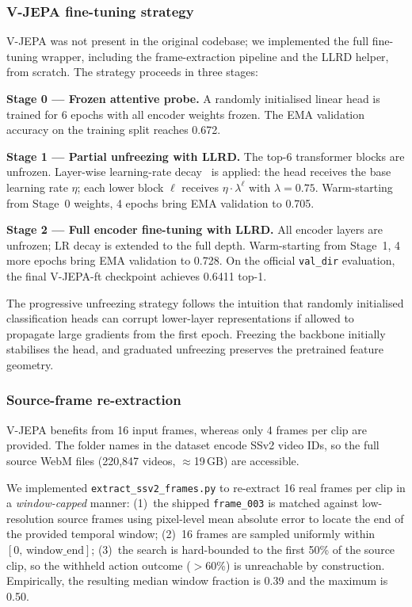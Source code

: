 \documentclass[10pt,twocolumn,letterpaper]{article}
\begin{document}
\subsubsection{V-JEPA fine-tuning strategy}

V-JEPA was not present in the original codebase; we implemented the
full fine-tuning wrapper, including the frame-extraction pipeline and
the LLRD helper, from scratch.  The strategy proceeds in three stages:

\textbf{Stage 0 — Frozen attentive probe.}  A randomly initialised
linear head is trained for 6 epochs with all encoder weights frozen.
The EMA validation accuracy on the training split reaches 0.672.

\textbf{Stage 1 — Partial unfreezing with LLRD.}  The top-6 transformer
blocks are unfrozen.  Layer-wise learning-rate decay~\cite{clark2020electra,bao2022beit,he2022mae}
is applied: the head receives the base learning rate $\eta$; each lower
block $\ell$ receives $\eta \cdot \lambda^\ell$ with $\lambda{=}0.75$.
Warm-starting from Stage~0 weights, 4 epochs bring EMA validation to
0.705.

\textbf{Stage 2 — Full encoder fine-tuning with LLRD.}  All encoder
layers are unfrozen; LR decay is extended to the full depth.
Warm-starting from Stage~1, 4 more epochs bring EMA validation to 0.728.
On the official \texttt{val\_dir} evaluation, the final V-JEPA-ft
checkpoint achieves 0.6411 top-1.

The progressive unfreezing strategy follows the intuition that randomly
initialised classification heads can corrupt lower-layer representations
if allowed to propagate large gradients from the first epoch.  Freezing
the backbone initially stabilises the head, and graduated unfreezing
preserves the pretrained feature geometry.

\subsubsection{Source-frame re-extraction}
\label{sec:extraction}

V-JEPA benefits from 16 input frames, whereas only 4 frames per clip are
provided.  The folder names in the dataset encode SSv2 video IDs, so the
full source WebM files (220{,}847 videos, $\approx$19\,GB) are accessible.

We implemented \texttt{extract\_ssv2\_frames.py} to re-extract 16
real frames per clip in a \emph{window-capped} manner:
(1)~the shipped \texttt{frame\_003} is matched against low-resolution
source frames using pixel-level mean absolute error to locate the
end of the provided temporal window;
(2)~16 frames are sampled uniformly within $[0,\,\text{window\_end}]$;
(3)~the search is hard-bounded to the first 50\% of the source clip,
so the withheld action outcome ($>$60\%) is unreachable by construction.
Empirically, the resulting median window fraction is 0.39 and the maximum
is 0.50.
\end{document}
